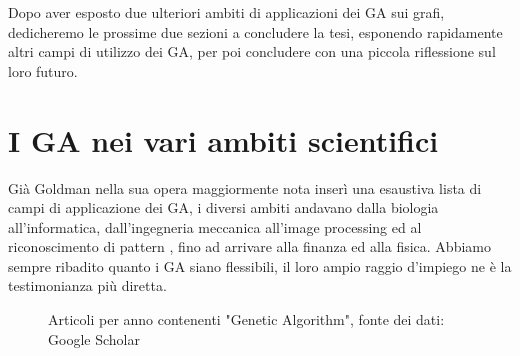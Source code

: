 Dopo aver esposto due ulteriori ambiti di applicazioni dei GA sui grafi, dedicheremo le prossime due sezioni a concludere la tesi, esponendo rapidamente altri campi di utilizzo dei GA, per poi concludere con una piccola riflessione sul loro futuro.
\section{I GA nei vari ambiti scientifici}
Gi\`a Goldman nella sua opera maggiormente nota \cite{goldberg1} inser\`i una esaustiva lista di campi di applicazione dei GA, i diversi ambiti andavano dalla biologia all'informatica, dall'ingegneria meccanica \cite{end1} all'image processing\cite{end2} ed al riconoscimento di pattern \cite{end3}, fino ad arrivare alla finanza\cite{end6} ed alla fisica. Abbiamo sempre ribadito quanto i GA siano flessibili, il loro ampio raggio d'impiego ne \`e la testimonianza pi\`u diretta.
\begin{figure}[H]%
    \centering
    \caption{Articoli per anno contenenti "Genetic Algorithm", fonte dei dati: Google Scholar}
    \label{fig:articles}%
\end{figure}
